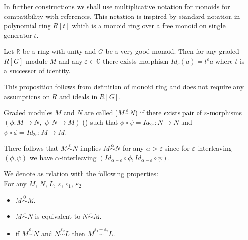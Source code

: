 In further constructions we shall use multiplicative notation for monoids for compatibility with references. This notation is inspired by standard notation in polynomial ring $R[t]$ which is a monoid ring over a free monoid on single generator $t$.

\begin{proposition}
  Let $\mathbb{R}$ be a ring with unity and $G$ be a very good monoid. Then for any graded $R[G]$-module $M$ and any $\varepsilon \in \mathbb{G}$ there exists morphism $Id_{\varepsilon}(a) = t^{\varepsilon}a$ where $t$ is a successor of identity.
\end{proposition}

This proposition follows from definition of monoid ring and does not require any assumptions on $R$ and ideals in $R[G]$.

\begin{definition}
  Graded modules $M$ and $N$ are called  ($M \stackrel{\varepsilon}{\sim} N$) if there exists pair of $\varepsilon$-morphisms $(\phi : M \to N,\;\psi : N \to M)$ () such that $\phi \circ \psi = Id_{2\varepsilon} : N \to N$ and $\psi \circ \phi = Id_{2\varepsilon} : M \to M$.\\
\end{definition}

\begin{remark}
  There follows that $M \stackrel{\varepsilon}{\sim} N$ implies $M \stackrel{\alpha}{\sim} N$ for any $\alpha > \varepsilon$ since for $\varepsilon$-interleaving $(\phi, \psi)$ we have $\alpha$-interleaving $(Id_{\alpha - \varepsilon} \circ \phi, Id_{\alpha - \varepsilon} \circ \psi)$.
\end{remark}

\begin{definition}
  We denote as  relation with the following properties:\\
  For any $M$, $N$, $L$, $\varepsilon$, $\varepsilon_1$, $\varepsilon_2$
  \begin{itemize}
    \item $M \stackrel{0}{\sim} M$.
    \item $M \stackrel{\varepsilon}{\sim} N$ is equivalent to $N \stackrel{\varepsilon}{\sim} M$.
    \item if $M \stackrel{\varepsilon_1}{\sim} N$ and $N \stackrel{\varepsilon_2}{\sim} L$ then $M \stackrel{\varepsilon_1 + \varepsilon_2}{\sim} L$.
  \end{itemize}
\end{definition}

